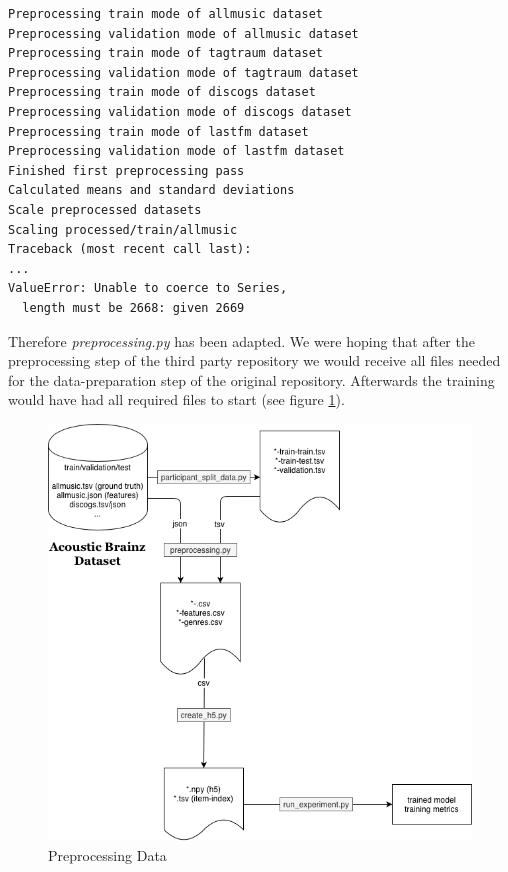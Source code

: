 \documentclass[sigconf,nonacm]{acmart}
\begin{document}
\begin{lstlisting}
Preprocessing train mode of allmusic dataset
Preprocessing validation mode of allmusic dataset
Preprocessing train mode of tagtraum dataset
Preprocessing validation mode of tagtraum dataset
Preprocessing train mode of discogs dataset
Preprocessing validation mode of discogs dataset
Preprocessing train mode of lastfm dataset
Preprocessing validation mode of lastfm dataset
Finished first preprocessing pass
Calculated means and standard deviations
Scale preprocessed datasets
Scaling processed/train/allmusic
Traceback (most recent call last):
...
ValueError: Unable to coerce to Series, 
  length must be 2668: given 2669
\end{lstlisting}

Therefore \textit{preprocessing.py} has been adapted.
We were hoping that after the preprocessing step
of the third party repository we would receive all files needed
for the data-preparation step of the original repository.
Afterwards the training would have had all required files
to start (see figure \ref{fig:preprocess}).

\begin{figure}
    \includegraphics[width=\linewidth]{Preprocess-Data.png}
    \caption{Preprocessing Data}
    \label{fig:preprocess}
\end{figure}
\end{document}
